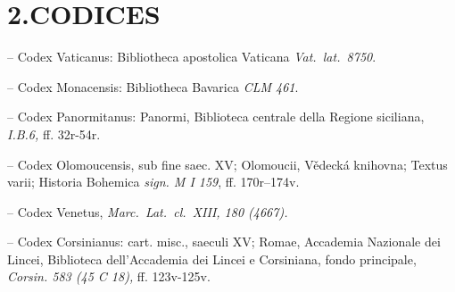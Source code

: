 \documentclass[a5paper,twoside]{article}
\begin{document}
\section*{2.\thinspace CODICES}

\bigskip

\begin{description}[noitemsep,itemsep=3pt,labelsep=5pt,font=\rmfamily]
\item[va] -- Codex Vaticanus: Bibliotheca apostolica Vaticana \emph{Vat.~lat.\ 8750}.
\item[m] -- Codex Monacensis: Bibliotheca Bavarica \emph{CLM 461}.
\item[pa] -- Codex Panormitanus: Panormi, Biblioteca centrale della Regione siciliana, \emph{I.B.6,} ff. 32r-54r.
\item[o] -- Codex Olomoucensis, sub fine saec. XV; Olomoucii, Vědecká knihovna; Textus varii; Historia Bohemica \emph{sign. M I 159}, ff. 170r–174v.
\item[ve] -- Codex Venetus, \emph{Marc.~Lat.\ cl.~XIII, 180 (4667).}
\item[co] -- Codex Corsinianus: cart. misc., saeculi XV; Romae, Accademia Nazionale dei Lincei, Biblioteca dell'Accademia dei Lincei e Corsiniana, fondo principale, \emph{Corsin. 583 (45 C 18),} ff. 123v-125v.
\end{description}


\clearpage
\thispagestyle{empty}
\hfill
\clearpage
\end{document}
